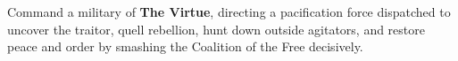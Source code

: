 \documentclass{novanarrative}
\begin{document}
\begin{center}
\begin{minipage}[c]{4in}
  Command a military of \textbf{The Virtue}, directing a pacification
  force dispatched to uncover the traitor, quell rebellion, hunt down
  outside agitators, and restore peace and order by smashing the
  Coalition of the Free decisively.
\end{minipage}%
\hspace{2em}%
\begin{minipage}[c]{1in}
\end{minipage}
\end{center}

\clearpage
\squelchbackground

\pagebreak
\restorebackground

\end{document}

